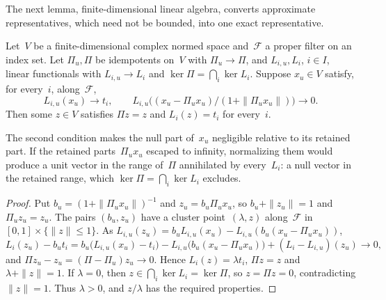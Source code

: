 The next lemma, finite-dimensional linear algebra, converts approximate representatives, which need not be bounded, into one exact representative.
\begin{lemma}\label{lem:F-represent}
Let~$V$ be a finite-dimensional complex normed space and~$\mathcal F$ a proper filter on an index set. Let $\Pi_u,\Pi$ be idempotents on~$V$ with $\Pi_u\to\Pi$, and $L_{i,u},L_i$, $i\in I$, linear functionals with $L_{i,u}\to L_i$ and $\ker\Pi=\bigcap_i\ker L_i$. Suppose $x_u\in V$ satisfy, for every~$i$, along~$\mathcal F$,
\begin{equation}\label{eq:F-normalized}
L_{i,u}(x_u)\longrightarrow t_i,\qquad
L_{i,u}\bigl((x_u-\Pi_ux_u)/(1+\|\Pi_ux_u\|)\bigr)\longrightarrow0.
\end{equation}
Then some $z\in V$ satisfies $\Pi z=z$ and $L_i(z)=t_i$ for every~$i$.
\end{lemma}
The second condition makes the null part of~$x_u$ negligible relative to its retained part. If the retained parts~$\Pi_ux_u$ escaped to infinity, normalizing them would produce a unit vector in the range of~$\Pi$ annihilated by every~$L_i$: a null vector in the retained range, which $\ker\Pi=\bigcap_i\ker L_i$ excludes.
\begin{proof}
Put $b_u=(1+\|\Pi_ux_u\|)^{-1}$ and $z_u=b_u\Pi_ux_u$, so $b_u+\|z_u\|=1$ and $\Pi_uz_u=z_u$. The pairs $(b_u,z_u)$ have a cluster point~$(\lambda,z)$ along~$\mathcal F$ in $[0,1]\times\{\|z\|\le1\}$. As $L_{i,u}(z_u)=b_uL_{i,u}(x_u)-L_{i,u}(b_u(x_u-\Pi_ux_u))$,
\begin{equation*}
L_i(z_u)-b_ut_i=b_u\bigl(L_{i,u}(x_u)-t_i\bigr)-L_{i,u}\bigl(b_u(x_u-\Pi_ux_u)\bigr)+(L_i-L_{i,u})(z_u)\longrightarrow0,
\end{equation*}
and $\Pi z_u-z_u=(\Pi-\Pi_u)z_u\to0$. Hence $L_i(z)=\lambda t_i$, $\Pi z=z$ and $\lambda+\|z\|=1$. If $\lambda=0$, then $z\in\bigcap_i\ker L_i=\ker\Pi$, so $z=\Pi z=0$, contradicting $\|z\|=1$. Thus $\lambda>0$, and $z/\lambda$ has the required properties.
\end{proof}

